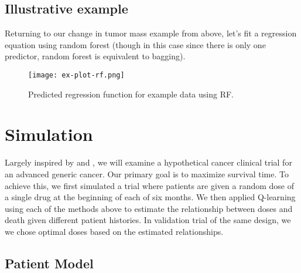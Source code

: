 \documentclass[12pt]{article}
\begin{document}
\subsection{Illustrative example} %
\label{sub:example}

Returning to our change in tumor mass example from above, let's fit a regression equation using random forest (though in this case since there is only one predictor, random forest is equivalent to bagging).

\begin{figure}[H]
\begin{center}
\texttt{[image: ex-plot-rf.png]}
\end{center}
\caption[Predicted regression function for example data using RF]{Predicted regression function for example data using RF.}
\label{fig:ex-plot-rf}
\end{figure}



\section{Simulation}

Largely inspired by \textcite{crt} and \textcite{nsclc}, we will examine a hypothetical cancer clinical trial for an advanced generic cancer. Our primary goal is to maximize survival time. To achieve this, we first simulated a trial where patients are given a random dose of a single drug at the beginning of each of six months. We then applied Q-learning using each of the methods above to estimate the relationship between doses and death given different patient histories. In validation trial of the same design, we we chose optimal doses based on the estimated relationships.

\subsection{Patient Model} %
\label{sub:vpm}

%
\end{document}
